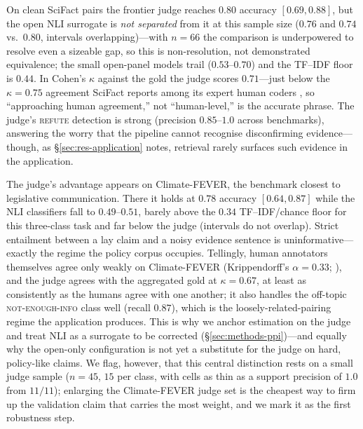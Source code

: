 On clean SciFact pairs the frontier judge reaches $0.80$ accuracy $[0.69, 0.88]$, but the open NLI
surrogate is \emph{not separated} from it at this sample size ($0.76$ and $0.74$ vs.\ $0.80$, intervals
overlapping)---with $n=66$ the comparison is underpowered to resolve even a sizeable gap, so this is
non-resolution, not demonstrated equivalence;
the small open-panel models trail ($0.53$--$0.70$) and the TF--IDF floor is $0.44$. In Cohen's $\kappa$
against the gold the judge scores $0.71$---just below the $\kappa=0.75$ agreement SciFact reports among
its expert human coders \citep{wadden2020fact}, so ``approaching human agreement,'' not ``human-level,''
is the accurate phrase. The judge's \textsc{refute} detection is strong (precision $0.85$--$1.0$ across
benchmarks), answering the worry that the pipeline cannot recognise disconfirming evidence---though, as
\S\ref{sec:res-application} notes, retrieval rarely surfaces such evidence in the application.

The judge's advantage appears on Climate-FEVER, the benchmark closest to legislative communication.
There it holds at $0.78$ accuracy $[0.64, 0.87]$ while the NLI classifiers fall to $0.49$--$0.51$, barely
above the $0.34$ TF--IDF/chance floor for this three-class task and far below the judge (intervals do not
overlap). Strict entailment between a lay claim and a noisy evidence sentence is uninformative---exactly
the regime the policy corpus occupies. Tellingly, human annotators themselves agree only weakly on
Climate-FEVER (Krippendorff's $\alpha=0.33$; \citealp{diggelmann2020climate}), and the judge agrees with
the aggregated gold at $\kappa=0.67$, at least as consistently as the humans agree with one another; it
also handles the off-topic \textsc{not-enough-info} class well (recall $0.87$), which is the
loosely-related-pairing regime the application produces. This is why we anchor estimation on the judge
and treat NLI as a surrogate to be corrected (\S\ref{sec:methods-ppi})---and equally why the open-only
configuration is not yet a substitute for the judge on hard, policy-like claims. We flag, however, that
this central distinction rests on a small judge sample ($n=45$, $15$ per class, with cells as thin as a
support precision of $1.0$ from $11/11$); enlarging the Climate-FEVER judge set is the cheapest way to
firm up the validation claim that carries the most weight, and we mark it as the first robustness step.

